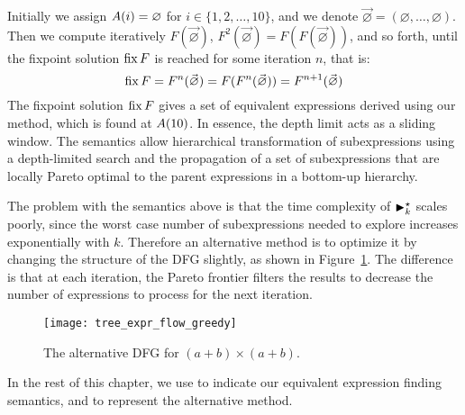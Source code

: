 Initially we assign $A({i}) = \varnothing$ for $i\in\{1,2,\ldots,10\}$,
and we denote $\vec\varnothing = (\varnothing, \ldots, \varnothing)$.
Then we compute iteratively $F(\vec\varnothing)$, $F^2(\vec\varnothing) =
F(F(\vec\varnothing))$, and so forth, until the fixpoint solution $\operatorname{\mathrm{fix}} F$ is
reached for some iteration $n$, that is:
\begin{equation}
    \operatorname{\mathrm{fix}} F = F^n(\vec\varnothing) =
    F(F^n(\vec\varnothing)) = F^{n + 1}(\vec\varnothing)
\end{equation}
The fixpoint solution $\operatorname{\mathrm{fix}} F$ gives a set of equivalent expressions derived
using our method, which is found at $A({10})$. In essence, the depth limit
acts as a sliding window.  The semantics allow hierarchical transformation of
subexpressions using a depth-limited search and the propagation of a set of
subexpressions that are locally Pareto optimal to the parent expressions in a
bottom-up hierarchy.

The problem with the semantics above is that the time complexity of
$\operatorname{\blacktriangleright}^\star_k$ scales poorly, since the worst case number of subexpressions
needed to explore increases exponentially with $k$. Therefore an alternative
method is to optimize it by changing the structure of the DFG slightly, as
shown in Figure~\ref{fig:tree_expr_flow_greedy}. The difference is that at each
iteration, the Pareto frontier filters the results to decrease the number of
expressions to process for the next iteration.
\begin{figure}[ht]
    \centering
    \texttt{[image: tree\_expr\_flow\_greedy]}
    \caption{The alternative DFG for $(a + b) \times (a + b)$.
    }\label{fig:tree_expr_flow_greedy}
\end{figure}

In the rest of this chapter, we use \frontiertrace{} to indicate our equivalent
expression finding semantics, and \greedytrace{} to represent the alternative
method.
